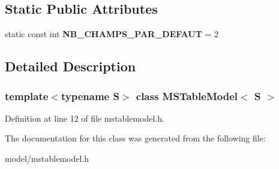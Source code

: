 \subsection*{Static Public Attributes}
\begin{DoxyCompactItemize}
\item 
\hypertarget{class_m_s_table_model_ac3e1edb66b11ddd8a43516624d770dc6}{
static const int {\bfseries NB\_\-CHAMPS\_\-PAR\_\-DEFAUT} = 2}
\label{class_m_s_table_model_ac3e1edb66b11ddd8a43516624d770dc6}

\end{DoxyCompactItemize}


\subsection{Detailed Description}
\subsubsection*{template$<$typename S$>$ class MSTableModel$<$ S $>$}



Definition at line 12 of file mstablemodel.h.



The documentation for this class was generated from the following file:\begin{DoxyCompactItemize}
\item 
model/mstablemodel.h\end{DoxyCompactItemize}
